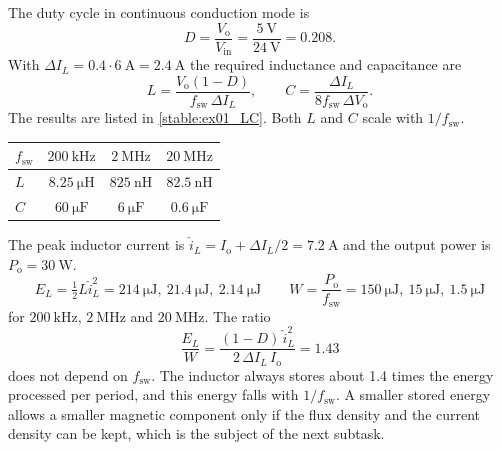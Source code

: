 \begin{solutionblock}
	The duty cycle in continuous conduction mode is
	\begin{equation}
		D = \frac{V_\mathrm{o}}{V_\mathrm{in}} = \frac{\SI{5}{\volt}}{\SI{24}{\volt}} = 0.208.
	\end{equation}
	With $\Delta I_L = 0.4\cdot\SI{6}{\ampere} = \SI{2.4}{\ampere}$ the required inductance and capacitance are
	\begin{equation}
		L = \frac{V_\mathrm{o}(1-D)}{f_\mathrm{sw}\,\Delta I_L}, \qquad C = \frac{\Delta I_L}{8 f_\mathrm{sw}\,\Delta V_\mathrm{o}}.
	\end{equation}
	The results are listed in \autoref{stable:ex01_LC}. Both $L$ and $C$ scale with $1/f_\mathrm{sw}$.
	\begin{solutiontable}[ht]
		\centering
		\begin{tabular}{lccc}
			\toprule
			$f_\mathrm{sw}$ & $\SI{200}{\kilo\hertz}$  & $\SI{2}{\mega\hertz}$   & $\SI{20}{\mega\hertz}$  \\
			\midrule
			$L$             & $\SI{8.25}{\micro\henry}$ & $\SI{825}{\nano\henry}$ & $\SI{82.5}{\nano\henry}$ \\
			$C$             & $\SI{60}{\micro\farad}$   & $\SI{6}{\micro\farad}$  & $\SI{0.6}{\micro\farad}$ \\
			\bottomrule
		\end{tabular}
		\caption{Inductance and capacitance versus switching frequency.}
		\label{stable:ex01_LC}
	\end{solutiontable}
\end{solutionblock}


\begin{solutionblock}
	The peak inductor current is $\hat{i}_L = I_\mathrm{o}+\Delta I_L/2 = \SI{7.2}{\ampere}$ and the output power is $P_\mathrm{o}=\SI{30}{\watt}$.
	\begin{equation}
		E_L = \tfrac{1}{2} L \hat{i}_L^2 = \SI{214}{\micro\joule},\ \SI{21.4}{\micro\joule},\ \SI{2.14}{\micro\joule}
		\qquad
		W = \frac{P_\mathrm{o}}{f_\mathrm{sw}} = \SI{150}{\micro\joule},\ \SI{15}{\micro\joule},\ \SI{1.5}{\micro\joule}
	\end{equation}
	for $\SI{200}{\kilo\hertz}$, $\SI{2}{\mega\hertz}$ and $\SI{20}{\mega\hertz}$. The ratio
	\begin{equation}
		\frac{E_L}{W} = \frac{(1-D)\,\hat{i}_L^2}{2\,\Delta I_L\,I_\mathrm{o}} = 1.43
	\end{equation}
	does not depend on $f_\mathrm{sw}$. The inductor always stores about 1.4 times the energy processed per period, and this energy falls with $1/f_\mathrm{sw}$. A smaller stored energy allows a smaller magnetic component only if the flux density and the current density can be kept, which is the subject of the next subtask.
\end{solutionblock}


